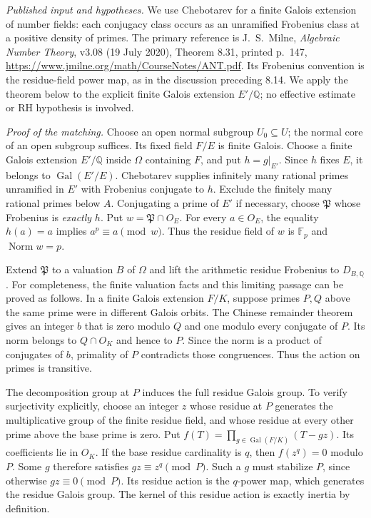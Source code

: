 \emph{Published input and hypotheses.}
We use Chebotarev for a finite Galois extension of number fields:
each conjugacy class occurs as an unramified Frobenius class at a
positive density of primes.  The primary reference is J.~S.~Milne,
\emph{Algebraic Number Theory}, v3.08 (19 July 2020), Theorem 8.31,
printed p.~147, \url{https://www.jmilne.org/math/CourseNotes/ANT.pdf}.
Its Frobenius convention is the residue-field power map, as in
the discussion preceding 8.14.  We apply the theorem below to the
explicit finite Galois extension $E'/\mathbb Q$; no effective estimate
or RH hypothesis is involved.

\emph{Proof of the matching.}
Choose an open normal subgroup $U_0\subseteq U$; the normal core of
an open subgroup suffices.  Its fixed field $F/E$ is finite Galois.
Choose a finite Galois extension $E'/\mathbb Q$ inside $\Omega$
containing $F$, and put $h=g|_{E'}$.  Since $h$ fixes $E$, it belongs
to $\operatorname{Gal}(E'/E)$.  Chebotarev supplies infinitely many
rational primes unramified in $E'$ with Frobenius conjugate to $h$.
Exclude the finitely many rational primes below $A$.  Conjugating a
prime of $E'$ if necessary, choose $\mathfrak P$ whose Frobenius is
\emph{exactly} $h$.  Put $w=\mathfrak P\cap O_E$.
For every $a\in O_E$, the equality $h(a)=a$ implies
$a^p\equiv a\pmod w$.  Thus the residue field of $w$ is
$\mathbb F_p$ and $\operatorname{Norm}w=p$.

Extend $\mathfrak P$ to a valuation $B$ of $\Omega$ and lift the
arithmetic residue Frobenius to $D_{B,\mathbb Q}$.
For completeness, the finite valuation facts and this limiting passage
can be proved as follows.  In a finite Galois extension $F/K$, suppose
primes $P,Q$ above the same prime were in different Galois orbits.
The Chinese remainder theorem gives an integer $b$ that is zero
modulo $Q$ and one modulo every conjugate of $P$.  Its norm belongs
to $Q\cap O_K$ and hence to $P$.  Since the norm is a product of
conjugates of $b$, primality of $P$ contradicts those congruences.
Thus the action on primes is transitive.

The decomposition group at $P$ induces the full residue Galois
group.  To verify surjectivity explicitly, choose an integer $z$
whose residue at $P$ generates the multiplicative group of the finite
residue field, and whose residue at every other prime above the base
prime is zero.  Put $f(T)=\prod_{g\in\operatorname{Gal}(F/K)}(T-gz)$.
Its coefficients lie in $O_K$.  If the base residue cardinality is
$q$, then $f(z^q)=0$ modulo $P$.  Some $g$ therefore satisfies
$gz\equiv z^q\pmod P$.  Such a $g$ must stabilize $P$, since otherwise
$gz\equiv0\pmod P$.  Its residue action is the $q$-power map, which
generates the residue Galois group.  The kernel of this residue action
is exactly inertia by definition.

